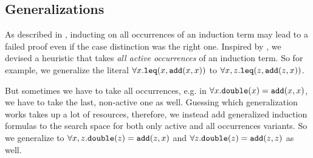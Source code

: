 \subsection{Generalizations}
As described in \cite{vampiregeneralization}, inducting on all occurrences of an induction term may lead to a failed proof even if the case distinction was the right one. Inspired by \cite{cruanes}, we devised a heuristic that takes \textit{all active occurrences} of an induction term. So for example, we generalize the literal $\forall x.\mathtt{leq}(x,\mathtt{add}(x,x))$ to $\forall x,z.\mathtt{leq}(z,\mathtt{add}(z,x))$.

But sometimes we have to take all occurrences, e.g. in $\forall x.\mathtt{double}(x) = \mathtt{add}(x,x)$, we have to take the last, non-active one as well. Guessing which generalization works takes up a lot of resources, therefore, we instead add generalized induction formulas to the search space for both only active and all occurrences variants. So we generalize to $\forall x,z.\mathtt{double}(z) = \mathtt{add}(z,x)$ and $\forall z.\mathtt{double}(z) = \mathtt{add}(z,z)$ as well.

